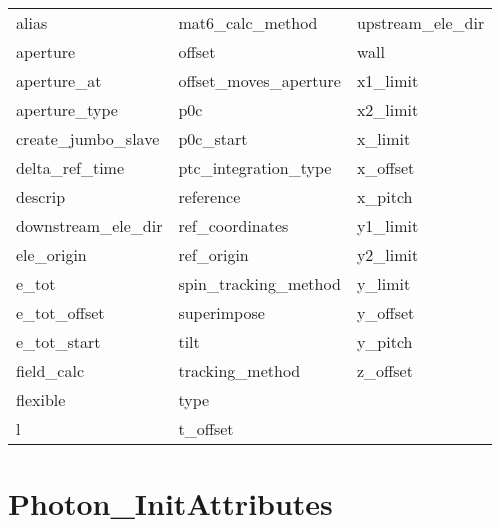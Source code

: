  \begin{tabular}{lll} \toprule
alias                       & mat6_calc_method            & upstream_ele_dir            \\
aperture                    & offset                      & wall                        \\
aperture_at                 & offset_moves_aperture       & x1_limit                    \\
aperture_type               & p0c                         & x2_limit                    \\
create_jumbo_slave          & p0c_start                   & x_limit                     \\
delta_ref_time              & ptc_integration_type        & x_offset                    \\
descrip                     & reference                   & x_pitch                     \\
downstream_ele_dir          & ref_coordinates             & y1_limit                    \\
ele_origin                  & ref_origin                  & y2_limit                    \\
e_tot                       & spin_tracking_method        & y_limit                     \\
e_tot_offset                & superimpose                 & y_offset                    \\
e_tot_start                 & tilt                        & y_pitch                     \\
field_calc                  & tracking_method             & z_offset                    \\
flexible                    & type                        &                             \\
l                           & t_offset                    &                             \\
 \bottomrule
 \end{tabular}
 \vfill
 
 \section{Photon_InitAttributes}
 \label{s:list.photon.init}
 
